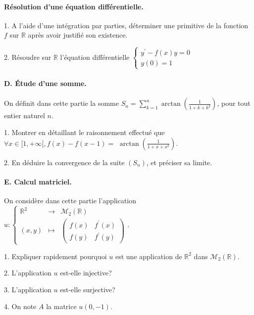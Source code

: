 \documentclass[a4paper, 11pt,reqno]{article}
\begin{document}
\begin{exercice}
\paragraph{Résolution d'une équation différentielle.}

1. A l'aide d'une intégration par parties, déterminer une primitive de la fonction $f$ sur $\mathbb{R}$ après avoir justifié son existence.

2. Résoudre sur $\mathbb{R}$ l'équation différentielle $\left\{\begin{array}{l}y^{\prime}-f(x) y=0 \\ y(0)=1\end{array}\right.$

\paragraph{D. Étude d'une somme.}

On définit dans cette partie la somme $S_{n}=\sum_{k=1}^{n} \arctan \left(\frac{1}{1+k+k^{2}}\right)$, pour tout entier naturel $n$.

1. Montrer en détaillant le raisonnement effectué que $\forall x \in[1,+\infty[, f(x)-f(x-1)=$ $\arctan \left(\frac{1}{1+x+x^{2}}\right)$.

2. En déduire la convergence de la suite $\left(S_{n}\right)$, et préciser sa limite. 

\paragraph{E. Calcul matriciel.}

On considère dans cette partie l'application $u:\left\{\begin{array}{clc}\mathbb{R}^{2} & \rightarrow & \mathcal{M}_{2}(\mathbb{R}) \\ (x, y) & \mapsto & \left(\begin{array}{cc}f(x) & f^{\prime}(x) \\ f(y) & f^{\prime}(y)\end{array}\right)\end{array}\right.$.

1. Expliquer rapidement pourquoi $u$ est une application de $\mathbb{R}^{2}$ dans $\mathcal{M}_{2}(\mathbb{R})$.

2. L'application $u$ est-elle injective?

3. L'application $u$ est-elle surjective?

4. On note $A$ la matrice $u(0,-1)$.


\end{exercice}
\end{document}
